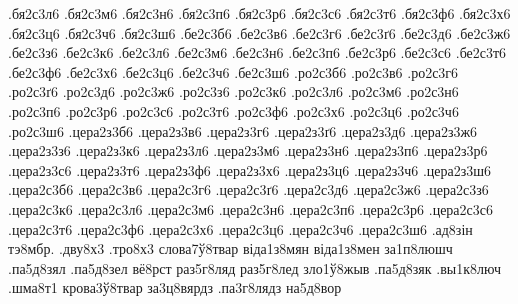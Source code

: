 {.бя2с3л6
.бя2с3м6
.бя2с3н6
.бя2с3п6
.бя2с3р6
.бя2с3с6
.бя2с3т6
.бя2с3ф6
.бя2с3х6
.бя2с3ц6
.бя2с3ч6
.бя2с3ш6
.бе2с3б6
.бе2с3в6
.бе2с3г6
.бе2с3ґ6
.бе2с3д6
.бе2с3ж6
.бе2с3з6
.бе2с3к6
.бе2с3л6
.бе2с3м6
.бе2с3н6
.бе2с3п6
.бе2с3р6
.бе2с3с6
.бе2с3т6
.бе2с3ф6
.бе2с3х6
.бе2с3ц6
.бе2с3ч6
.бе2с3ш6
.ро2с3б6
.ро2с3в6
.ро2с3г6
.ро2с3ґ6
.ро2с3д6
.ро2с3ж6
.ро2с3з6
.ро2с3к6
.ро2с3л6
.ро2с3м6
.ро2с3н6
.ро2с3п6
.ро2с3р6
.ро2с3с6
.ро2с3т6
.ро2с3ф6
.ро2с3х6
.ро2с3ц6
.ро2с3ч6
.ро2с3ш6
.цера2з3б6
.цера2з3в6
.цера2з3г6
.цера2з3ґ6
.цера2з3д6
.цера2з3ж6
.цера2з3з6
.цера2з3к6
.цера2з3л6
.цера2з3м6
.цера2з3н6
.цера2з3п6
.цера2з3р6
.цера2з3с6
.цера2з3т6
.цера2з3ф6
.цера2з3х6
.цера2з3ц6
.цера2з3ч6
.цера2з3ш6
.цера2с3б6
.цера2с3в6
.цера2с3г6
.цера2с3ґ6
.цера2с3д6
.цера2с3ж6
.цера2с3з6
.цера2с3к6
.цера2с3л6
.цера2с3м6
.цера2с3н6
.цера2с3п6
.цера2с3р6
.цера2с3с6
.цера2с3т6
.цера2с3ф6
.цера2с3х6
.цера2с3ц6
.цера2с3ч6
.цера2с3ш6
.ад8зін
тэ8мбр.
.дву8х3
.тро8х3
слова7ў8твар
віда1з8мян
віда1з8мен
за1п8люшч
.па5д8зял
.па5д8зел
вё8рст
раз5г8ляд
раз5г8лед
зло1ў8жыв
.па5д8зяк
.вы1к8люч
.шма8т1
крова3ў8твар
за3ц8вярдз
.па3г8лядз
на5д8вор
}

